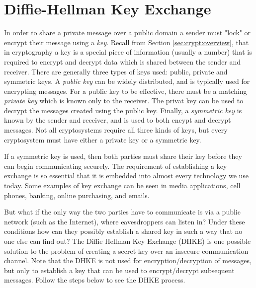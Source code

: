 \section{Diffie-Hellman Key Exchange}\label{sec:DHKE:1}

In order to share a private message over a public domain a sender must  "lock" or encrypt their message using a \emph{key}.  Recall from Section \ref{sec:crypt:overview}, that in cryptography a  key is a special piece of information (usually a number)  that is required to encrypt and decrypt data which is shared between the sender and receiver. There are generally three types of keys used: public, private and symmetric keys. A \emph{public key} can be widely distributed, and is typically used for encrypting messages.  For a public key to be effective, there must be a matching \emph{private key} which is known only to the receiver. The privat key can be used to decrypt the messages created using the public key.  Finally, a \emph{symmetric key} is known by the sender and receiver, and is used to both encypt and decrypt messages.  Not all cryptosystems require all three kinds of keys, but every cryptosystem must have either a private key or a symmetric key.

  If a symmetric key is used, then both parties must share their key before they can begin communicating securely. The requirement of establishing a key exchange is so essential that it is embedded into almost every technology we use today.  Some examples of key exchange can be seen in media applications, cell phones, banking, online purchasing, and emails.  

 But what if the only way the two parties have to communicate is via a public network (such as the Internet), where eavesdroppers can listen in?  Under these conditions how can they possibly establish a shared key in such a way that no one else can find out?  The Diffie Hellman Key Exchange (DHKE) is one possible solution to the problem of creating a secret key over an insecure communication channel.  Note that the DHKE is not used for encryption/decryption of messages, but only to establish a key that can be used to encrypt/decrypt subsequent messages.  Follow the steps below to see the DHKE process.  

